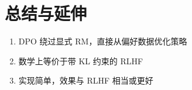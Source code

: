 \section{总结与延伸}
\begin{enumerate}
  \item DPO 绕过显式 RM，直接从偏好数据优化策略
  \item 数学上等价于带 KL 约束的 RLHF
  \item 实现简单，效果与 RLHF 相当或更好
\end{enumerate}

